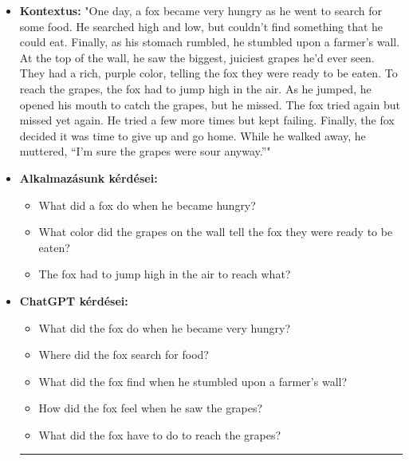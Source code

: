 \begin{itemize}
\item \textbf{Kontextus:} "One day, a fox became very hungry as he went to search for some food. He searched high and low, but couldn’t find something that he could eat.
Finally, as his stomach rumbled, he stumbled upon a farmer’s wall. At the top of the wall, he saw the biggest, juiciest grapes he’d ever seen. They had a rich, purple color, telling the fox they were ready to be eaten. To reach the grapes, the fox had to jump high in the air. As he jumped, he opened his mouth to catch the grapes, but he missed. The fox tried again but missed yet again. He tried a few more times but kept failing. Finally, the fox decided it was time to give up and go home. While he walked away, he muttered, “I’m sure the grapes were sour anyway.”"
\item \textbf{Alkalmazásunk kérdései:} 
	\begin{itemize}
		\item What did a fox do when he became hungry?
		\item What color did the grapes on the wall tell the fox they were ready to be eaten?
		\item The fox had to jump high in the air to reach what?
	\end{itemize}
\item \textbf{ChatGPT kérdései:}
	\begin{itemize}
		\item What did the fox do when he became very hungry?
		\item Where did the fox search for food?
		\item What did the fox find when he stumbled upon a farmer’s wall?
		\item How did the fox feel when he saw the grapes?
		\item What did the fox have to do to reach the grapes?
	\end{itemize}
	
\hrule	
	

\end{itemize}

